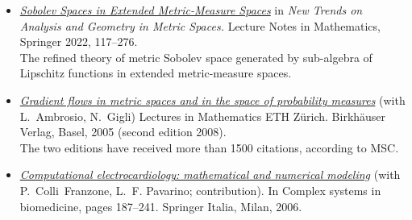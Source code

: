 \documentclass[reqno,11pt]{article}
\theoremstyle{plain}
\begin{document}
\begin{itemize}[topsep=-0.5\parsep,itemsep=-4pt,leftmargin=12pt,listparindent=-12pt,itemindent=-12pt] 
\renewcommand{\labelitemi}{}
\item
\href{https://doi.org/10.1007/978-3-030-84141-6}{\em Sobolev Spaces in Extended Metric-Measure Spaces} 
\newblock in \emph{New Trends on Analysis and Geometry in Metric Spaces.}
Lecture Notes in Mathematics, Springer 2022, 117--276.\\
{\small\textsf{The refined theory of metric Sobolev space generated by
    sub-algebra of Lipschitz functions in extended metric-measure spaces.}}
    

\item \href{https://link.springer.com/book/10.1007/b137080}{\em Gradient flows in metric spaces and in the space of probability
   measures} (with L.~Ambrosio, N.~Gigli)
\newblock Lectures in Mathematics ETH Z\"urich. Birkh\"auser Verlag, Basel,
 2005 (second edition 2008).\\
 The two editions have received more than
1500 
 citations, according to MSC.

\item
\href{https://link.springer.com/chapter/10.1007/88-470-0396-2_6}{\em 
Computational electrocardiology: mathematical and numerical modeling}
 (with P.~Colli~Franzone, L.~F. Pavarino; contribution).
 \newblock In {Complex systems in biomedicine}, pages 187--241. Springer
 Italia, Milan, 2006.







\end{itemize}
\end{document}
